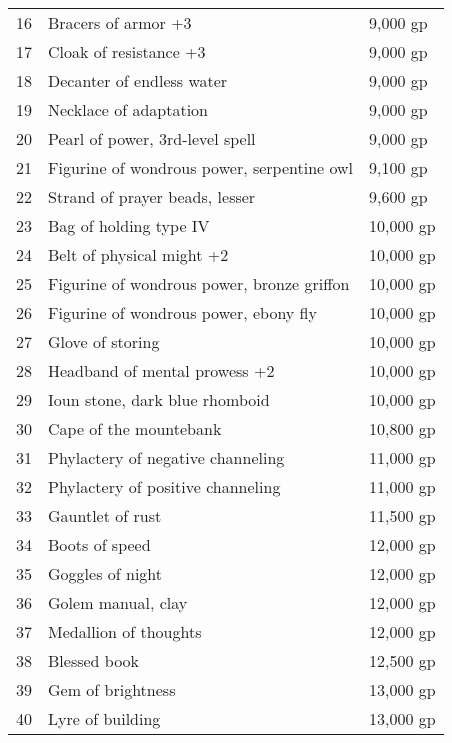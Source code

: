\begin{table}[]
\begin{tabular}{lll}
16  & Bracers of armor +3                         & 9,000 gp     \\
17  & Cloak of resistance +3                      & 9,000 gp     \\
18  & Decanter of endless water                   & 9,000 gp     \\
19  & Necklace of adaptation                      & 9,000 gp     \\
20  & Pearl of power, 3rd-level spell             & 9,000 gp     \\
21  & Figurine of wondrous power, serpentine owl  & 9,100 gp     \\
22  & Strand of prayer beads, lesser              & 9,600 gp     \\
23  & Bag of holding type IV                      & 10,000 gp    \\
24  & Belt of physical might +2                   & 10,000 gp    \\
25  & Figurine of wondrous power, bronze griffon  & 10,000 gp    \\
26  & Figurine of wondrous power, ebony fly       & 10,000 gp    \\
27  & Glove of storing                            & 10,000 gp    \\
28  & Headband of mental prowess +2               & 10,000 gp    \\
29  & Ioun stone, dark blue rhomboid              & 10,000 gp    \\
30  & Cape of the mountebank                      & 10,800 gp    \\
31  & Phylactery of negative channeling           & 11,000 gp    \\
32  & Phylactery of positive channeling           & 11,000 gp    \\
33  & Gauntlet of rust                            & 11,500 gp    \\
34  & Boots of speed                              & 12,000 gp    \\
35  & Goggles of night                            & 12,000 gp    \\
36  & Golem manual, clay                          & 12,000 gp    \\
37  & Medallion of thoughts                       & 12,000 gp    \\
38  & Blessed book                                & 12,500 gp    \\
39  & Gem of brightness                           & 13,000 gp    \\
40  & Lyre of building                            & 13,000 gp    \\

\end{tabular}
\end{table}
